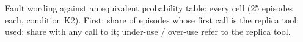 \begin{table}[!htbp]
\centering
\caption{Fault wording against an equivalent probability table: every cell (25 episodes each, condition K2). First: share of episodes whose first call is the replica tool; used: share with any call to it; under-use / over-use refer to the replica tool.}
\label{tab:t-cells}
\scriptsize\setlength{\tabcolsep}{3pt}

\end{table}
